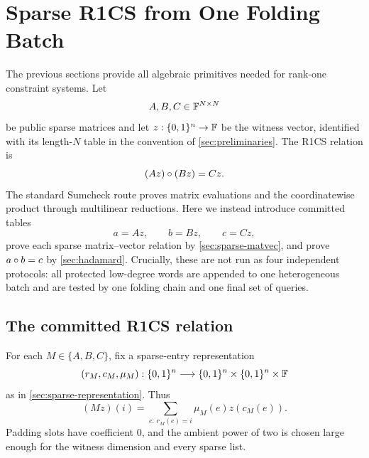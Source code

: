 \section{Sparse R1CS from One Folding Batch}
\label{sec:r1cs}

The previous sections provide all algebraic primitives needed for rank-one constraint systems.  Let
\[
  A,B,C\in\mathbb{F}^{N\times N}
\]
be public sparse matrices and let $z:\{0,1\}^n\to\mathbb{F}$ be the witness vector, identified with its length-$N$ table in the convention of \cref{sec:preliminaries}.  The R1CS relation is
\begin{equation}
  (Az)\circ(Bz)=Cz.
  \label{eq:r1cs-standard-relation}
\end{equation}
The standard Sumcheck route proves matrix evaluations and the coordinatewise product through multilinear reductions.  Here we instead introduce committed tables
\[
  a=Az,
  \qquad
  b=Bz,
  \qquad
  c=Cz,
\]
prove each sparse matrix--vector relation by \cref{sec:sparse-matvec}, and prove $a\circ b=c$ by \cref{sec:hadamard}.  Crucially, these are not run as four independent protocols: all protected low-degree words are appended to one heterogeneous batch and are tested by one folding chain and one final set of queries.

\subsection{The committed R1CS relation}
\label{sec:r1cs-relation}

For each $M\in\{A,B,C\}$, fix a sparse-entry representation
\begin{equation}
  (r_M,c_M,\mu_M):\{0,1\}^n\longrightarrow \{0,1\}^n\times\{0,1\}^n\times\mathbb{F}
  \label{eq:r1cs-sparse-representations}
\end{equation}
as in \cref{sec:sparse-representation}.  Thus
\begin{equation}
  (Mz)(i)
  =\sum_{e:\,r_M(e)=i}\mu_M(e)z(c_M(e)).
  \label{eq:r1cs-sparse-coordinate}
\end{equation}
Padding slots have coefficient $0$, and the ambient power of two is chosen large enough for the witness dimension and every sparse list.

